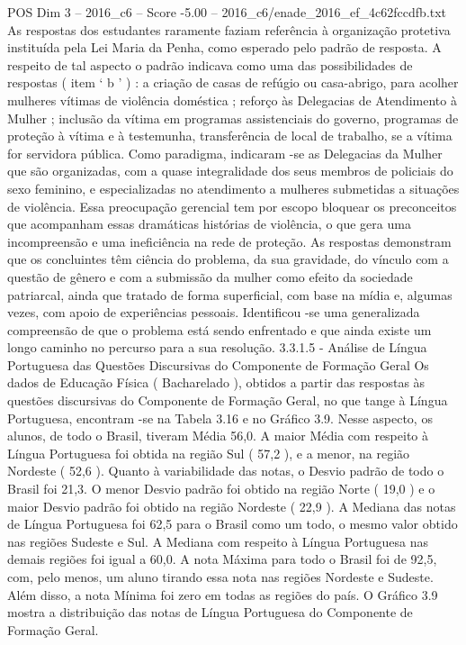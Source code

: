 \begin{textsample}{POS Dim 3 – 2016\_c6 – Score -5.00 – 2016\_c6/enade\_2016\_ef\_4c62fccdfb.txt}
As respostas dos estudantes raramente faziam referência à organização protetiva instituída pela Lei Maria da Penha, como esperado pelo padrão de resposta.
A respeito de tal aspecto o padrão indicava como uma das possibilidades de respostas ( item ‘ b ’ ) : a criação de casas de refúgio ou casa-abrigo, para acolher mulheres vítimas de violência doméstica ; reforço às Delegacias de Atendimento à Mulher ; inclusão da vítima em programas assistenciais do governo, programas de proteção à vítima e à testemunha, transferência de local de trabalho, se a vítima for servidora pública.
Como paradigma, indicaram -se as Delegacias da Mulher que são organizadas, com a quase integralidade dos seus membros de policiais do sexo feminino, e especializadas no atendimento a mulheres submetidas a situações de violência.
Essa preocupação gerencial tem por escopo bloquear os preconceitos que acompanham essas dramáticas histórias de violência, o que gera uma incompreensão e uma ineficiência na rede de proteção.
As respostas demonstram que os concluintes têm ciência do problema, da sua gravidade, do vínculo com a questão de gênero e com a submissão da mulher como efeito da sociedade patriarcal, ainda que tratado de forma superficial, com base na mídia e, algumas vezes, com apoio de experiências pessoais.
Identificou -se uma generalizada compreensão de que o problema está sendo enfrentado e que ainda existe um longo caminho no percurso para a sua resolução. 3.3.1.5 - Análise de Língua Portuguesa das Questões Discursivas do Componente de Formação Geral Os dados de Educação Física ( Bacharelado ), obtidos a partir das respostas às questões discursivas do Componente de Formação Geral, no que tange à Língua Portuguesa, encontram -se na Tabela 3.16 e no Gráfico 3.9.
Nesse aspecto, os alunos, de todo o Brasil, tiveram Média 56,0.
A maior Média com respeito à Língua Portuguesa foi obtida na região Sul ( 57,2 ), e a menor, na região Nordeste ( 52,6 ).
Quanto à variabilidade das notas, o Desvio padrão de todo o Brasil foi 21,3.
O menor Desvio padrão foi obtido na região Norte ( 19,0 ) e o maior Desvio padrão foi obtido na região Nordeste ( 22,9 ).
A Mediana das notas de Língua Portuguesa foi 62,5 para o Brasil como um todo, o mesmo valor obtido nas regiões Sudeste e Sul.
A Mediana com respeito à Língua Portuguesa nas demais regiões foi igual a 60,0.
A nota Máxima para todo o Brasil foi de 92,5, com, pelo menos, um aluno tirando essa nota nas regiões Nordeste e Sudeste.
Além disso, a nota Mínima foi zero em todas as regiões do país.
O Gráfico 3.9 mostra a distribuição das notas de Língua Portuguesa do Componente de Formação Geral.

\end{textsample}
